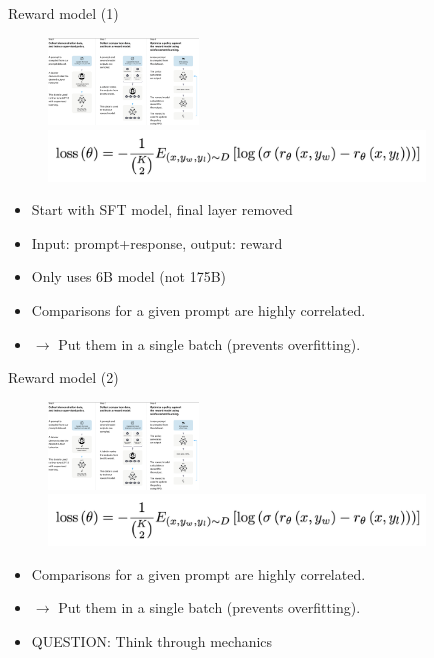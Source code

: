 \begin{vbframe}{Reward model (1)}


\begin{figure}
\centering
\includegraphics[width = 4cm]{figure/threesteps.png}\\
\includegraphics[width = 10cm]{figure/rewardloss.png}
\end{figure}


\begin{itemize}
	\item Start with SFT model, final layer removed
        	\item Input: prompt+response, output: reward
        \item Only uses 6B model (not 175B)
        \item Comparisons  for a
        	given prompt are
        	highly correlated.
                \item $\rightarrow$ Put them in
        	a single batch (prevents overfitting).
\end{itemize}

\vfill

\end{vbframe}

\begin{vbframe}{Reward model (2)}


\begin{figure}
\centering
\includegraphics[width = 4cm]{figure/threesteps.png}\\
\includegraphics[width = 10cm]{figure/rewardloss.png}
\end{figure}


\begin{itemize}
        \item Comparisons  for a
        	given prompt are
        	highly correlated.
                \item $\rightarrow$ Put them in
        	a single batch (prevents overfitting).
\item QUESTION: Think through mechanics
\end{itemize}

\vfill

\end{vbframe}


